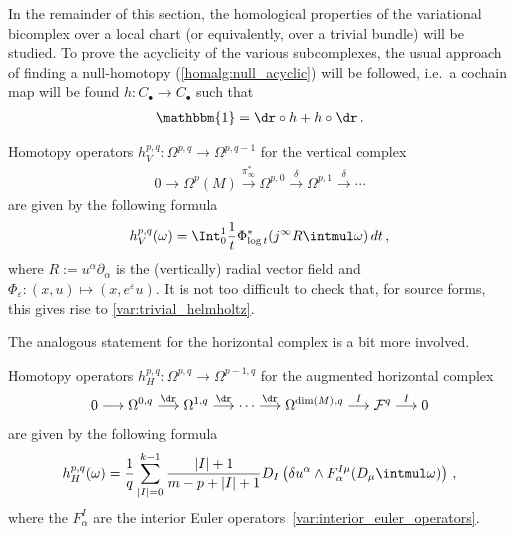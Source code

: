     In the remainder of this section, the homological properties of the variational bicomplex over a local chart (or equivalently, over a trivial bundle) will be studied. To prove the acyclicity of the various subcomplexes, the usual approach of finding a null-homotopy (\cref{homalg:null_acyclic}) will be followed, i.e.~a cochain map will be found $h:C_\bullet\rightarrow C_\bullet$ such that
    \begin{gather}
        \mathbbm{1} = \dr\circ h + h\circ\dr\,.
    \end{gather}

    \begin{property}
        Homotopy operators $h^{p,q}_V:\Omega^{p,q}\rightarrow\Omega^{p,q-1}$ for the vertical complex
        \begin{gather}
            0\longrightarrow\Omega^p(M)\overset{\pi_\infty^*}{\longrightarrow}\Omega^{p,0}\overset{\delta}{\longrightarrow}\Omega^{p,1}\overset{\delta}{\longrightarrow}\cdots
        \end{gather}
        are given by the following formula
        \begin{gather}
            h^{p,q}_V(\omega) = \Int_0^1\frac{1}{t}\Phi^*_{\log t}(j^\infty R\intmul\omega)\,dt\,,
        \end{gather}
        where $R:=u^\alpha\partial_\alpha$ is the (vertically) radial vector field and $\Phi_\varepsilon:(x,u)\mapsto(x,e^\varepsilon u)$. It is not too difficult to check that, for source forms, this gives rise to \cref{var:trivial_helmholtz}.
    \end{property}
    The analogous statement for the horizontal complex is a bit more involved.
    \begin{property}
        Homotopy operators $h^{p,q}_H:\Omega^{p,q}\rightarrow\Omega^{p-1,q}$ for the augmented horizontal complex
        \begin{gather}
            0\longrightarrow\Omega^{0,q}\overset{\dr}{\longrightarrow}\Omega^{1,q}\overset{\dr}{\longrightarrow}\cdots\overset{\dr}{\longrightarrow}\Omega^{\dim(M),q}\overset{I}{\longrightarrow}\mathcal{F}^q\overset{I}{\longrightarrow}0
        \end{gather}
        are given by the following formula
        \begin{gather}
            h^{p,q}_H(\omega) = \frac{1}{q}\sum_{|I|=0}^{k-1}\frac{|I|+1}{m-p+|I|+1}D_I\left(\delta u^\alpha\wedge F^{I\mu}_\alpha(D_\mu\intmul\omega)\right)\,,
        \end{gather}
        where the $F^I_\alpha$ are the interior Euler operators~\eqref{var:interior_euler_operators}.
    \end{property}
